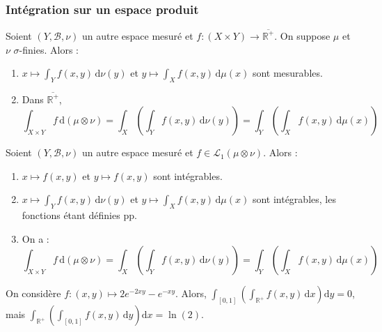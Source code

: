 	\subsubsection{Intégration sur un espace produit}


	\begin{theorem}
		Soient $(Y, \mathcal{B}, \nu)$ un autre espace mesuré et $f : (X \times Y) \rightarrow \overline{\mathbb{R}^+}$. On suppose $\mu$ et $\nu$ $\sigma$-finies. Alors :
		\begin{enumerate}[label=(\roman*)]
			\item $x \mapsto \int_Y f(x,y) \, \mathrm{d}\nu(y)$ et $y \mapsto \int_X f(x,y) \, \mathrm{d}\mu(x)$ sont mesurables.
			\item Dans $\overline{\mathbb{R}^+}$,
			\[ \int_{X \times Y} f \, \mathrm{d}(\mu \otimes \nu) = \int_X \left( \int_Y f(x,y) \, \mathrm{d}\nu(y) \right) = \int_Y \left( \int_X f(x,y) \, \mathrm{d}\mu(x) \right) \]
		\end{enumerate}
	\end{theorem}

	\begin{theorem}
		Soient $(Y, \mathcal{B}, \nu)$ un autre espace mesuré et $f \in \mathcal{L}_1 (\mu \otimes \nu)$. Alors :
		\begin{enumerate}[label=(\roman*)]
			\item $x \mapsto f(x,y)$ et $y \mapsto f(x,y)$ sont intégrables.
			\item $x \mapsto \int_Y f(x,y) \, \mathrm{d}\nu(y)$ et $y \mapsto \int_X f(x,y) \, \mathrm{d}\mu(x)$ sont intégrables, les fonctions étant définies pp.
			\item On a :
			\[ \int_{X \times Y} f \, \mathrm{d}(\mu \otimes \nu) = \int_X \left( \int_Y f(x,y) \, \mathrm{d}\nu(y) \right) = \int_Y \left( \int_X f(x,y) \, \mathrm{d}\mu(x) \right) \]
		\end{enumerate}
	\end{theorem}

	\begin{cexample}
		On considère $f : (x,y) \mapsto 2e^{-2xy} - e^{-xy}$. Alors, $\int_{[0,1]} \left( \int_{\mathbb{R}^+} f(x,y) \, \mathrm{d}x \right) \mathrm{d}y = 0$, mais $\int_{\mathbb{R}^+} \left( \int_{[0,1]} f(x,y) \, \mathrm{d}y \right) \mathrm{d}x = \ln(2)$.
	\end{cexample}


